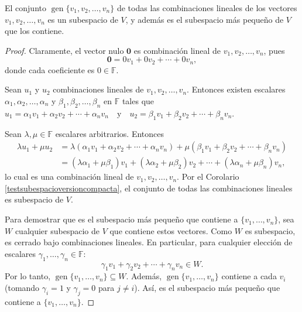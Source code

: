 \begin{theorem}
El conjunto $\operatorname{gen}\{v_1,v_2,\dots, v_n\}$ de todas las combinaciones lineales de los vectores $v_1,v_2,\dots, v_n$ es un subespacio de $V$, y además es el subespacio más pequeño de $V$ que los contiene.
\end{theorem}

\begin{proof}
Claramente, el vector nulo $\mathbf{0}$ es combinación lineal de $v_1,v_2,\dots, v_n$, pues  \[ \mathbf{0} = 0v_1 + 0v_2 + \cdots + 0v_n,\] donde cada coeficiente es $0 \in \mathbb{F}$. 

Sean $u_1$ y $u_2$ combinaciones lineales de $v_1,v_2,\dots, v_n$. Entonces existen escalares $\alpha_1,\alpha_2,\dots,\alpha_n$ y $\beta_1,\beta_2,\dots,\beta_n$ en $\mathbb{F}$ tales que \(
u_1 = \alpha_1 v_1 + \alpha_2 v_2 + \cdots + \alpha_n v_n \quad \text{y} \quad u_2 = \beta_1 v_1 + \beta_2 v_2 + \cdots + \beta_n v_n.
\)

Sean $\lambda, \mu \in \mathbb{F}$ escalares arbitrarios. Entonces
\begin{align*}
\lambda u_1 + \mu u_2 &= \lambda \left( \alpha_1 v_1 + \alpha_2 v_2 + \cdots + \alpha_n v_n \right) + \mu \left( \beta_1 v_1 + \beta_2 v_2 + \cdots + \beta_n v_n \right) \\
&= (\lambda \alpha_1 + \mu \beta_1)v_1 + (\lambda \alpha_2 + \mu \beta_2)v_2 + \cdots + (\lambda \alpha_n + \mu \beta_n)v_n,
\end{align*}
lo cual es una combinación lineal de $v_1,v_2,\dots, v_n$. Por el Corolario \ref{testsubespacioversioncompacta}, el conjunto de todas las combinaciones lineales es subespacio de $V$.

Para demostrar que es el subespacio más pequeño que contiene a $\{v_1,\dots,v_n\}$, sea $W$ cualquier subespacio de $V$ que contiene estos vectores. Como $W$ es subespacio, es cerrado bajo combinaciones lineales. En particular, para cualquier elección de escalares $\gamma_1,\dots,\gamma_n \in \mathbb{F}$: 
\[
\gamma_1v_1 + \gamma_2v_2 + \cdots + \gamma_nv_n \in W.
\]
Por lo tanto, $\operatorname{gen}\{v_1,\dots,v_n\} \subseteq W$. Además, $\operatorname{gen}\{v_1,\dots,v_n\}$ contiene a cada $v_i$ (tomando $\gamma_i=1$ y $\gamma_j=0$ para $j\neq i$). Así, es el subespacio más pequeño que contiene a $\{v_1,\dots,v_n\}$.
\end{proof}

